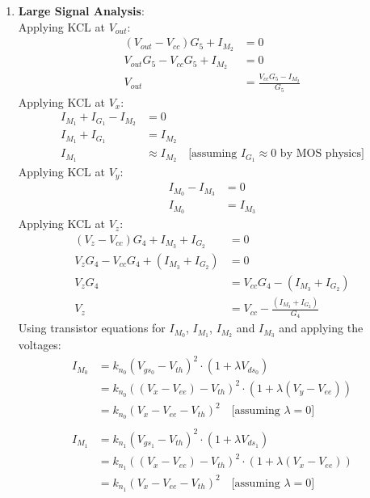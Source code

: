 \begin{enumerate}
  \item \textbf{Large Signal Analysis}:\\
    Applying KCL at $V_{out}$:
    \begin{align*}
      (V_{out} - V_{cc})G_5 + I_{M_2} &= 0 \\
      V_{out}G_5 - V_{cc}G_5 + I_{M_2} &= 0 \\
      V_{out} &= \frac{V_{cc}G_5 - I_{M_2}}{G_5} \tag{1}
    \end{align*}
    Applying KCL at $V_{x}$:
    \begin{align*}
      I_{M_1} + I_{G_1} - I_{M_2} &= 0 \\
      I_{M_1} + I_{G_1} &= I_{M_2} \\
      I_{M_1} &\approx I_{M_2} \quad \text{[assuming } I_{G_1} \approx 0 \text{ by MOS physics]} \tag{2}
    \end{align*}
    Applying KCL at $V_{y}$:
    \begin{align*}
      I_{M_0} - I_{M_3} &= 0 \\
      I_{M_0} &= I_{M_3} \tag{3}
    \end{align*}
    Applying KCL at $V_{z}$:
    \begin{align*}
      (V_{z} - V_{cc})G_4 + I_{M_3} + I_{G_2} &= 0 \\
      V_{z}G_4 - V_{cc}G_4 + (I_{M_3} + I_{G_2}) &= 0 \\
      V_{z}G_4 &= V_{cc}G_4 - (I_{M_3} + I_{G_2}) \\
      V_{z} &= V_{cc} - \frac{(I_{M_3} + I_{G_2})}{G_4} \tag{4}
    \end{align*}
    Using transistor equations for $I_{M_0}$, $I_{M_1}$, $I_{M_2}$ and $I_{M_3}$
    and applying the voltages:
    \begin{align*}
      I_{M_0} &= k_{n_0}(V_{gs_0} - V_{th})^2 \cdot (1 + \lambda V_{ds_0}) \\
              &= k_{n_0}((V_{x} - V_{ee}) - V_{th})^2 \cdot (1 + \lambda (V_{y} - V_{ee})) \\
              &= k_{n_0}(V_{x} - V_{ee} - V_{th})^2 \quad \text{[assuming } \lambda = 0 \text{]} \tag{5} \\ \\
      I_{M_1} &= k_{n_1}(V_{gs_1} - V_{th})^2 \cdot (1 + \lambda V_{ds_1}) \\
              &= k_{n_1}((V_{x} - V_{ee}) - V_{th})^2 \cdot (1 + \lambda (V_{x} - V_{ee})) \\
              &= k_{n_1}(V_{x} - V_{ee} - V_{th})^2 \quad \text{[assuming } \lambda = 0 \text{]} \tag{6} \\ \\

\end{align*}
\end{enumerate}
